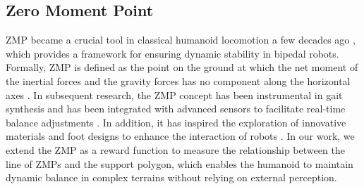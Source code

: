 \subsection{Zero Moment Point}

ZMP became a crucial tool in classical humanoid locomotion a few decades ago \cite{ZMP-1}, which provides a framework for ensuring dynamic stability in bipedal robots. Formally, ZMP is defined as the point on the ground at which the net moment of the inertial forces and the gravity forces has no component along the horizontal axes \cite{ZMP-2}. In subsequent research, the ZMP concept has been instrumental in gait synthesis and has been integrated with advanced sensors to facilitate real-time balance adjustments \cite{ZIP-35}. In addition, it has inspired the exploration of innovative materials and foot designs to enhance the interaction of robots \cite{ZMP-book}. 
In our work, we extend the ZMP as a reward function to measure the relationship between the line of ZMPs and the support polygon, which enables the humanoid to maintain dynamic balance in complex terrains without relying on external perception.
